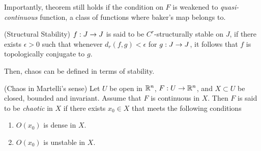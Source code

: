 \documentclass[12pt,draft,twoside]{book}
\begin{document}
Importantly, theorem still holds if the condition on $F$ is weakened to {\it quasi-continuous} function, a class of functions where baker's map belongs to.

\begin{definition}
  (Structural Stability) $f: J \rightarrow J$ is said to be $C^r$-structurally
  stable on $J$, if there exists $\epsilon > 0$ such that whenever
  $d_r(f,g) < \epsilon$ for $g: J\rightarrow J$, it follows that $f$
  is topologically conjugate to $g$.
\end{definition}

Then, chaos can be defined in terms of stability.

\begin{definition}
  (Chaos in Martelli's sense)
  Let $U$ be open in $\mathbb{R}^n$, $F: U \to \mathbb{R}^n$, and $X\subset U$ be closed, bounded and invariant.
  Assume that $F$ is continuous in $X$.
  Then $F$ is said to be \textit{chaotic} in $X$ if there exists $x_0 \in X$ that meets the following conditions
  \begin{enumerate}
    \item $O(x_0)$ is dense in $X$.
    \item $O(x_0)$ is unstable in $X$.
  \end{enumerate}
  \label{defn:chaosmartelli}
\end{definition}
\end{document}

